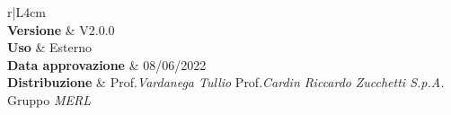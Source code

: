 \begin{center}
	\begin{tabular}{r|L{4cm}}
			 \\
			\hline
			\textbf{Versione}			& V2.0.0 \\
			\textbf{Uso}		& Esterno \\
			\textbf{Data approvazione} 			& 08/06/2022 \\
			\textbf{Distribuzione} 	&	Prof.\textit{Vardanega Tullio} \newline Prof.\textit{Cardin Riccardo} \newline \textit{Zucchetti S.p.A.} \newline Gruppo \textit{MERL} \\
	\end{tabular}
\end{center}
